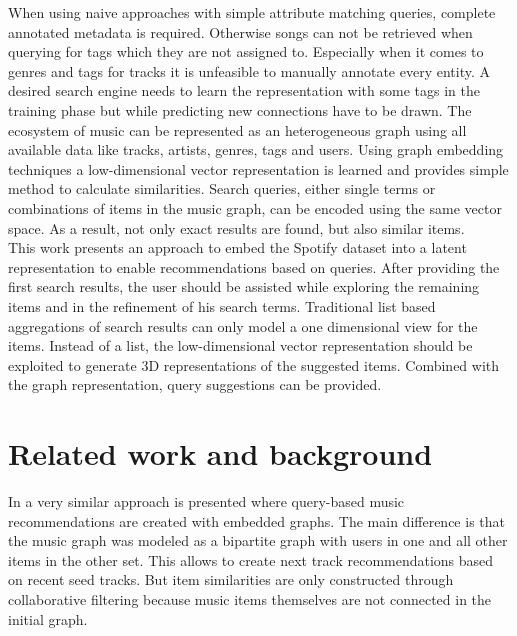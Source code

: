 \documentclass[sigconf]{acmart}
\begin{document}
When using naive approaches with simple attribute matching queries, complete annotated metadata is required. Otherwise songs can not be retrieved when querying for tags which they are not assigned to. Especially when it comes to genres and tags for tracks it is unfeasible to manually annotate every entity. A desired search engine needs to learn the representation with some tags in the training phase but while predicting new connections have to be drawn.
The ecosystem of music can be represented as an heterogeneous graph using all available data like tracks, artists, genres, tags and users. Using graph embedding techniques a low-dimensional vector representation is learned and provides simple method to calculate similarities. Search queries, either single terms or combinations of items in the music graph, can be encoded using the same vector space. As a result, not only exact results are found, but also similar items. \\

This work presents an approach to embed the Spotify dataset into a latent representation to enable recommendations based on queries. After providing the first search results, the user should be assisted while exploring the remaining items and in the refinement of his search terms. Traditional list based aggregations of search results can only model a one dimensional view for the items. Instead of a list, the low-dimensional vector representation should be exploited to generate 3D representations of the suggested items. Combined with the graph representation, query suggestions can be provided.



\section{Related work and background}
In \cite{chen2016query} a very similar approach is presented where query-based music recommendations are created with embedded graphs. The main difference is that the music graph was modeled as a bipartite graph with users in one and all other items in the other set. This allows to create next track recommendations based on recent seed tracks. But item similarities are only constructed through collaborative filtering because music items themselves are not connected in the initial graph. 
\end{document}
